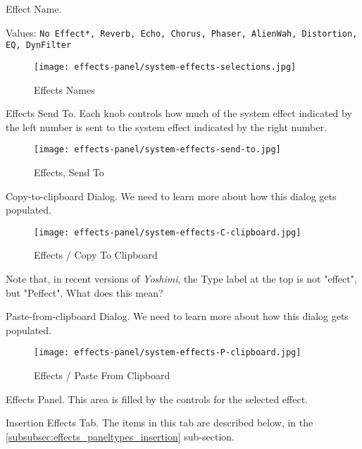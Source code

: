    Effect Name.

   Values: \texttt{No Effect*, Reverb, Echo, Chorus, Phaser, AlienWah,
      Distortion, EQ, DynFilter}

\begin{figure}[H]
   \centering 
   \texttt{[image: effects-panel/system-effects-selections.jpg]}
   \caption{Effects Names}
   \label{fig:effects_names}
\end{figure}

   Effects Send To.
   Each knob controls how much of the system effect indicated by the left
   number is sent to the system effect indicated by the right number.

\begin{figure}[H]
   \centering 
   \texttt{[image: effects-panel/system-effects-send-to.jpg]}
   \caption{Effects, Send To}
   \label{fig:effects_send_to}
\end{figure}

   Copy-to-clipboard Dialog.
   We need to learn more about how this dialog gets populated.

\begin{figure}[H]
   \centering 
   \texttt{[image: effects-panel/system-effects-C-clipboard.jpg]}
   \caption{Effects / Copy To Clipboard}
   \label{fig:effects_copy_to_clipboard}
\end{figure}

   Note that, in recent versions of \textsl{Yoshimi}, the Type label at the top
   is not "effect", but "Peffect".  What does this mean?

   Paste-from-clipboard Dialog.
   We need to learn more about how this dialog gets populated.

\begin{figure}[H]
   \centering 
   \texttt{[image: effects-panel/system-effects-P-clipboard.jpg]}
   \caption{Effects / Paste From Clipboard}
   \label{fig:effects_paste_from_clipboard}
\end{figure}

   Effects Panel.
   This area is filled by the controls for the selected effect.

   Insertion Effects Tab.
   The items in this tab are described below,
   in the \ref{subsubsec:effects_paneltypes_insertion}
   sub-section.

